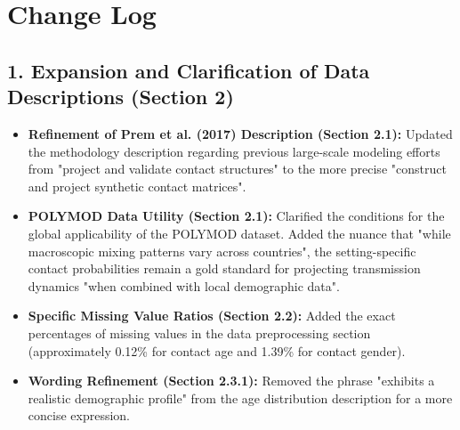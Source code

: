 \section*{Change Log}

\subsection*{1. Expansion and Clarification of Data Descriptions (Section 2)}
\begin{itemize}
    \item \textbf{Refinement of Prem et al. (2017) Description (Section 2.1):} Updated the methodology description regarding previous large-scale modeling efforts from "project and validate contact structures" to the more precise "construct and project synthetic contact matrices".
    \item \textbf{POLYMOD Data Utility (Section 2.1):} Clarified the conditions for the global applicability of the POLYMOD dataset. Added the nuance that "while macroscopic mixing patterns vary across countries", the setting-specific contact probabilities remain a gold standard for projecting transmission dynamics "when combined with local demographic data".
    \item \textbf{Specific Missing Value Ratios (Section 2.2):} Added the exact percentages of missing values in the data preprocessing section (approximately 0.12\% for contact age and 1.39\% for contact gender).
    \item \textbf{Wording Refinement (Section 2.3.1):} Removed the phrase "exhibits a realistic demographic profile" from the age distribution description for a more concise expression.
\end{itemize}


